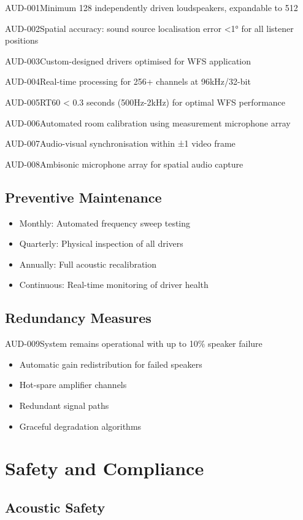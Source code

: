 \begin{requirement}{AUD-001}{Minimum 128 independently driven loudspeakers, expandable to 512}
\begin{requirement}{AUD-002}{Spatial accuracy: sound source localisation error <1° for all listener positions}
\begin{requirement}{AUD-003}{Custom-designed drivers optimised for WFS application}
\begin{requirement}{AUD-004}{Real-time processing for 256+ channels at 96kHz/32-bit}
\begin{requirement}{AUD-005}{RT60 < 0.3 seconds (500Hz-2kHz) for optimal WFS performance}
\begin{requirement}{AUD-006}{Automated room calibration using measurement microphone array}
\begin{requirement}{AUD-007}{Audio-visual synchronisation within ±1 video frame}
\begin{requirement}{AUD-008}{Ambisonic microphone array for spatial audio capture}
\subsection{Preventive Maintenance}

\begin{itemize}
    \item Monthly: Automated frequency sweep testing
    \item Quarterly: Physical inspection of all drivers
    \item Annually: Full acoustic recalibration
    \item Continuous: Real-time monitoring of driver health
\end{itemize}

\subsection{Redundancy Measures}

\begin{requirement}{AUD-009}{System remains operational with up to 10\% speaker failure}

\begin{itemize}
    \item Automatic gain redistribution for failed speakers
    \item Hot-spare amplifier channels
    \item Redundant signal paths
    \item Graceful degradation algorithms
\end{itemize}

\section{Safety and Compliance}

\subsection{Acoustic Safety}


\end{requirement}
\end{requirement}
\end{requirement}
\end{requirement}
\end{requirement}
\end{requirement}
\end{requirement}
\end{requirement}
\end{requirement}
